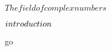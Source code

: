 \documentclass[../Main/main]{subfiles}
\begin{document}
\unit{ $ The field of complex numbers $ }
{
	\introduction
	{ 
		$introduction\\$ 
	}

	go

}
\end{document}
